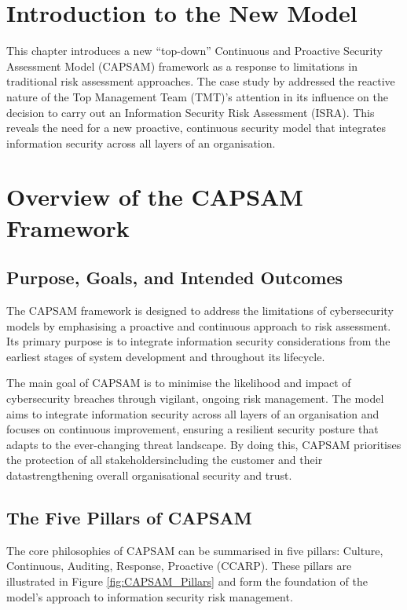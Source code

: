 \section{Introduction to the New Model}
This chapter introduces a new ``top-down'' Continuous and Proactive Security Assessment Model (CAPSAM) framework as a response to limitations in traditional risk assessment approaches. The case study by \citet{shaikh2023information} addressed the reactive nature of the Top Management Team (TMT)'s attention in its influence on the decision to carry out an Information Security Risk Assessment (ISRA). This reveals the need for a new proactive, continuous security model that integrates information security across all layers of an organisation.

\section{Overview of the CAPSAM Framework}
    \subsection{Purpose, Goals, and Intended Outcomes}
    The CAPSAM framework is designed to address the limitations of cybersecurity models by emphasising a proactive and continuous approach to risk assessment. Its primary purpose is to integrate information security considerations from the earliest stages of system development and throughout its lifecycle.

    The main goal of CAPSAM is to minimise the likelihood and impact of cybersecurity breaches through vigilant, ongoing risk management. The model aims to integrate information security across all layers of an organisation and focuses on continuous improvement, ensuring a resilient security posture that adapts to the ever-changing threat landscape. By doing this, CAPSAM prioritises the protection of all stakeholders\textemdash including the customer and their data\textemdash strengthening overall organisational security and trust.

    \subsection{The Five Pillars of CAPSAM}
    The core philosophies of CAPSAM can be summarised in five pillars: Culture, Continuous, Auditing, Response, Proactive (CCARP). These pillars are illustrated in Figure \ref{fig:CAPSAM_Pillars} and form the foundation of the model's approach to information security risk management.

